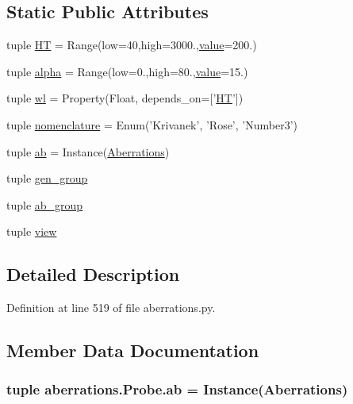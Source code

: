 \subsection*{Static Public Attributes}
\begin{DoxyCompactItemize}
\item 
tuple \hyperlink{classaberrations_1_1_probe_a5f0a8b8760e38015d065d3faab514642}{H\-T} = Range(low=40,high=3000.,\hyperlink{read_config_file_8m_afcc7a4b78ecd8fa7e713f8cfa0f51017}{value}=200.)
\item 
tuple \hyperlink{classaberrations_1_1_probe_a4c41bbc5180131ebfb0bf219a3580fc8}{alpha} = Range(low=0.,high=80.,\hyperlink{read_config_file_8m_afcc7a4b78ecd8fa7e713f8cfa0f51017}{value}=15.)
\item 
tuple \hyperlink{classaberrations_1_1_probe_adb91a6ae085cbb9a4c3199fb5cba63f0}{wl} = Property(Float, depends\-\_\-on=\mbox{[}'\hyperlink{classaberrations_1_1_probe_a5f0a8b8760e38015d065d3faab514642}{H\-T}'\mbox{]})
\item 
tuple \hyperlink{classaberrations_1_1_probe_afca5c76ee4c97f65813d19157db396b3}{nomenclature} = Enum('Krivanek', 'Rose', 'Number3')
\item 
tuple \hyperlink{classaberrations_1_1_probe_aab105182dd5e2cc48962cc536c000ac3}{ab} = Instance(\hyperlink{classaberrations_1_1_aberrations}{Aberrations})
\item 
tuple \hyperlink{classaberrations_1_1_probe_a2f6137c882c5bc472db425ef945bf937}{gen\-\_\-group}
\item 
tuple \hyperlink{classaberrations_1_1_probe_a5bb14f69d46f84ec516fd540431c2d91}{ab\-\_\-group}
\item 
tuple \hyperlink{classaberrations_1_1_probe_a321f4dd1122df9da6e42a190d93d2883}{view}
\end{DoxyCompactItemize}


\subsection{Detailed Description}


Definition at line 519 of file aberrations.\-py.



\subsection{Member Data Documentation}
\hypertarget{classaberrations_1_1_probe_aab105182dd5e2cc48962cc536c000ac3}{
\subsubsection[{ab}]{\setlength{\rightskip}{0pt plus 5cm}tuple aberrations.\-Probe.\-ab = Instance({\bf Aberrations})\hspace{0.3cm}{\ttfamily [static]}}}\label{classaberrations_1_1_probe_aab105182dd5e2cc48962cc536c000ac3}



